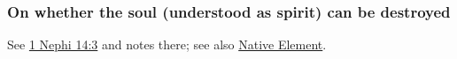 	
		
	\subsubsection{On whether the soul (understood as spirit) can be destroyed}
		\label{SOUL-destroy}
		
		See \hyperref[1NEPHI-14-3]{1 Nephi 14:3} and notes there; see also \hyperref[NATIVEELEMENT]{Native Element}.